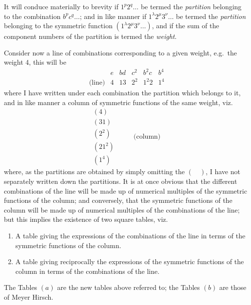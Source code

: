 \documentclass[11pt,a4paper]{book}
\begin{document}
\begin{center}
It will conduce materially to brevity if $1^p 2^q \ldots$ be termed the
\emph{partition} belonging to the combination $b^p c^q \ldots$; and in like
manner if $1^{\lambda} 2^{\mu} 3^{\nu}\ldots$ be termed the \emph{partition}
belonging to the symmetric function $(1^{\lambda} 2^{\mu} 3^{\nu}\ldots)$, and if
the sum of the component numbers of the partition is termed the \emph{weight}.

Consider now a line of combinations corresponding to a given weight, e.g.\ the
weight 4, this will be
\[
\begin{array}{c|ccccc}
& e & bd & c^2 & b^2 c & b^4 \\ \hline
\text{(line)} & 4 & 13 & 2^2 & 1^2 2 & 1^4
\end{array}
\]
where I have written under each combination the partition which belongs to it,
and in like manner a column of symmetric functions of the same weight, viz.
\[
\begin{array}{c}
(4) \\
(31) \\
(2^2) \\
(21^2) \\
(1^4)
\end{array}
\qquad
\begin{array}{c}
\text{(column)}
\end{array}
\]
where, as the partitions are obtained by simply omitting the $(\quad)$, I have
not separately written down the partitions. It is at once obvious that the
different combinations of the line will be made up of numerical multiples of
the symmetric functions of the column; and conversely, that the symmetric
functions of the column will be made up of numerical multiples of the
combinations of the line; but this implies the existence of two square tables,
viz.
\begin{enumerate}[label=(\alph*)]
\item A table giving the expressions of the combinations of the line in terms
of the symmetric functions of the column.
\item A table giving reciprocally the expressions of the symmetric functions
of the column in terms of the combinations of the line.
\end{enumerate}

The Tables $(a)$ are the new tables above referred to; the Tables $(b)$ are
those of Meyer Hirsch.


\end{center}
\end{document}

